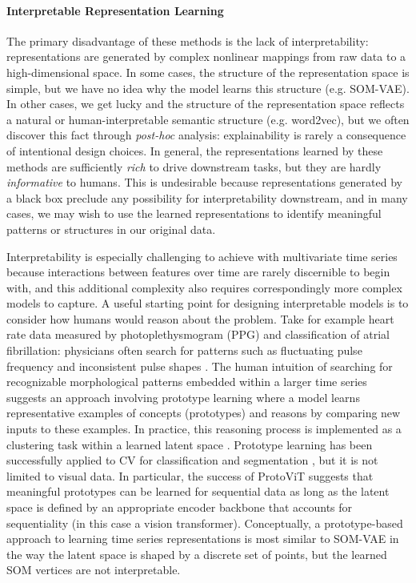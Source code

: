 \documentclass{article}
\begin{document}
\paragraph{Interpretable Representation Learning} The primary disadvantage of these methods is the lack of interpretability: representations are generated by complex nonlinear mappings from raw data to a high-dimensional space. In some cases, the structure of the representation space is simple, but we have no idea why the model learns this structure (e.g. SOM-VAE). In other cases, we get lucky and the structure of the representation space reflects a natural or human-interpretable semantic structure (e.g. word2vec), but we often discover this fact through \textit{post-hoc} analysis: explainability is rarely a consequence of intentional design choices. In general, the representations learned by these methods are sufficiently \textit{rich} to drive downstream tasks, but they are hardly \textit{informative} to humans. This is undesirable because representations generated by a black box preclude any possibility for interpretability downstream, and in many cases, we may wish to use the learned representations to identify meaningful patterns or structures in our original data. 

Interpretability is especially challenging to achieve with multivariate time series because interactions between features over time are rarely discernible to begin with, and this additional complexity also requires correspondingly more complex models to capture. A useful starting point for designing interpretable models is to consider how humans would reason about the problem. Take for example heart rate data measured by photoplethysmogram (PPG) and classification of atrial fibrillation: physicians often search for patterns such as fluctuating pulse frequency and inconsistent pulse shapes \cite{pereira20-afib}. The human intuition of searching for recognizable morphological patterns embedded within a larger time series suggests an approach involving prototype learning where a model learns representative examples of concepts (prototypes) and reasons by comparing new inputs to these examples. In practice, this reasoning process is implemented as a clustering task within a learned latent space \cite{li26-prototype}. Prototype learning has been successfully applied to CV for classification and segmentation \cite{chen19-protopnet, donnelly21-deformableprotopnet, sacha25-protoseg}, but it is not limited to visual data. In particular, the success of ProtoViT \cite{ma24-protovit} suggests that meaningful prototypes can be learned for sequential data as long as the latent space is defined by an appropriate encoder backbone that accounts for sequentiality (in this case a vision transformer). Conceptually, a prototype-based approach to learning time series representations is most similar to SOM-VAE in the way the latent space is shaped by a discrete set of points, but the learned SOM vertices are not interpretable. 
\end{document}
